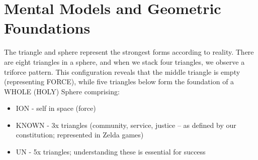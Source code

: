 ﻿\section{Mental Models and Geometric Foundations}

The triangle and sphere represent the strongest forms according to reality. There are eight triangles in a sphere, and when we stack four triangles, we observe a triforce pattern. This configuration reveals that the middle triangle is empty (representing FORCE), while five triangles below form the foundation of a WHOLE (HOLY) Sphere comprising:

\begin{itemize}
    \item ION - self in space (force)
    \item KNOWN - 3x triangles (community, service, justice -- as defined by our constitution; represented in Zelda games)
    \item UN - 5x triangles; understanding these is essential for success
\end{itemize}